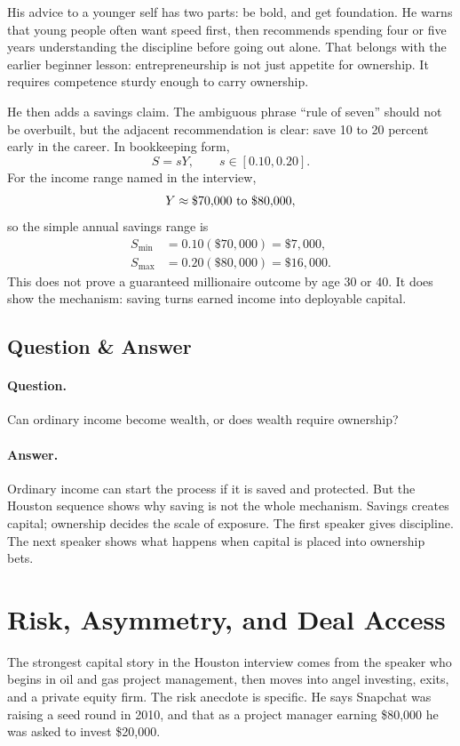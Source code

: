 \documentclass[11pt,oneside]{book}
\begin{document}
His advice to a younger self has two parts: be bold, and get foundation. He warns that young people often want speed first, then recommends spending four or five years understanding the discipline before going out alone. That belongs with the earlier beginner lesson: entrepreneurship is not just appetite for ownership. It requires competence sturdy enough to carry ownership.

He then adds a savings claim. The ambiguous phrase ``rule of seven'' should not be overbuilt, but the adjacent recommendation is clear: save 10 to 20 percent early in the career. In bookkeeping form,
\[
S=sY,\qquad s\in[0.10,0.20].
\]
For the income range named in the interview,
\[
Y\approx \$70{,}000\hbox{ to }\$80{,}000,
\]
so the simple annual savings range is
\begin{align}
S_{\min}&=0.10(\$70{,}000)=\$7{,}000,\\
S_{\max}&=0.20(\$80{,}000)=\$16{,}000.
\end{align}
This does not prove a guaranteed millionaire outcome by age 30 or 40. It does show the mechanism: saving turns earned income into deployable capital.

\subsection{Question \& Answer}

\paragraph{Question.}
Can ordinary income become wealth, or does wealth require ownership?

\paragraph{Answer.}
Ordinary income can start the process if it is saved and protected. But the Houston sequence shows why saving is not the whole mechanism. Savings creates capital; ownership decides the scale of exposure. The first speaker gives discipline. The next speaker shows what happens when capital is placed into ownership bets.

\section{Risk, Asymmetry, and Deal Access}

The strongest capital story in the Houston interview comes from the speaker who begins in oil and gas project management, then moves into angel investing, exits, and a private equity firm. The risk anecdote is specific. He says Snapchat was raising a seed round in 2010, and that as a project manager earning \$80,000 he was asked to invest \$20,000.
\end{document}
